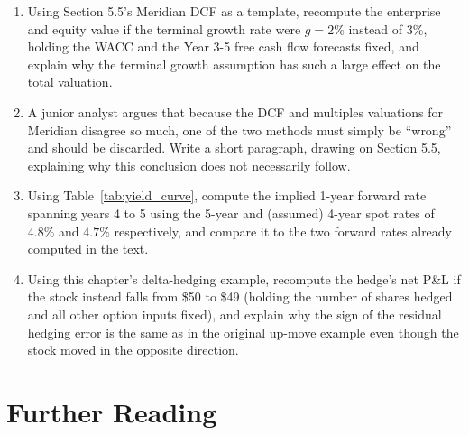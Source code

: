 \documentclass[../ai_in_finance]{subfiles}
\begin{document}
\begin{enumerate}
    \item Using Section 5.5's Meridian DCF as a template, recompute the enterprise and equity value if the terminal growth rate were $g=2\%$ instead of $3\%$, holding the WACC and the Year 3-5 free cash flow forecasts fixed, and explain why the terminal growth assumption has such a large effect on the total valuation.
    \item A junior analyst argues that because the DCF and multiples valuations for Meridian disagree so much, one of the two methods must simply be ``wrong'' and should be discarded. Write a short paragraph, drawing on Section 5.5, explaining why this conclusion does not necessarily follow.
    \item Using Table~\ref{tab:yield_curve}, compute the implied 1-year forward rate spanning years 4 to 5 using the 5-year and (assumed) 4-year spot rates of $4.8\%$ and $4.7\%$ respectively, and compare it to the two forward rates already computed in the text.
    \item Using this chapter's delta-hedging example, recompute the hedge's net P\&L if the stock instead falls from \$50 to \$49 (holding the number of shares hedged and all other option inputs fixed), and explain why the sign of the residual hedging error is the same as in the original up-move example even though the stock moved in the opposite direction.
\end{enumerate}

\section{Further Reading}
\end{document}
